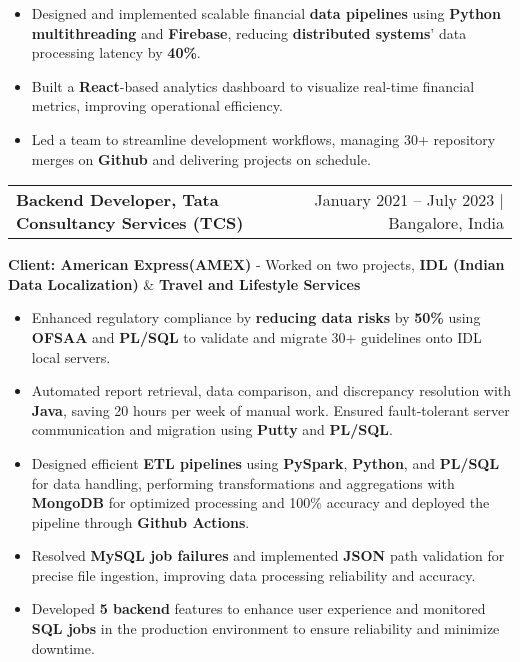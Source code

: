 \documentclass[10pt, legalpaper]{article}
\newenvironment{highlights}{
    \begin{itemize}[
        topsep=0.10 cm,
        parsep=0.10 cm,
        partopsep=0pt,
        itemsep=0pt,
        leftmargin=0 cm + 10pt
    ]
}{
    \end{itemize}
}
\newenvironment{onecolentry}{
    \par\noindent
}{
    \par
}
\begin{document}
\begin{onecolentry}
    \begin{highlights}
        \item Designed and implemented scalable financial \textbf{data pipelines} using \textbf{Python multithreading} and \textbf{Firebase}, reducing \textbf{distributed systems}' data processing latency by \textbf{40\%}.
        \item Built a \textbf{React}-based analytics dashboard to visualize real-time financial metrics, improving operational efficiency.
        \item Led a team to streamline development workflows, managing 30+ repository merges on \textbf{Github} and delivering projects on schedule.
    \end{highlights}
\end{onecolentry}

\vspace{0.0 cm}


\begin{tabularx}{\textwidth}{@{}Xr@{}}
    \textbf{Backend Developer, Tata Consultancy Services (TCS)} & January 2021 – July 2023 | Bangalore, India \\
\end{tabularx}
\vspace{-4.0mm}

\begin{onecolentry}

\textbf{Client: American Express(AMEX)} - Worked on two projects, \textbf{IDL (Indian Data Localization)} \& \textbf{Travel and Lifestyle Services}
\vspace{-1mm}
    \begin{highlights}
        \item Enhanced regulatory compliance by \textbf{reducing data risks} by\textbf{ 50\%} using \textbf{OFSAA} and \textbf{PL/SQL} to validate and migrate 30+ guidelines onto IDL local servers.
        \item Automated report retrieval, data comparison, and discrepancy resolution with \textbf{Java}, saving 20 hours per week of manual work. Ensured fault-tolerant server communication and migration using \textbf{Putty} and \textbf{PL/SQL}.
        \item Designed efficient \textbf{ETL pipelines} using \textbf{PySpark}, \textbf{Python}, and \textbf{PL/SQL} for data handling, performing transformations and aggregations with \textbf{MongoDB} for optimized processing and 100\% accuracy and deployed the pipeline through \textbf{Github Actions}.
        \item Resolved \textbf{MySQL job failures} and implemented\textbf{ JSON} path validation for precise file ingestion, improving data processing reliability and accuracy.
        \item Developed\textbf{ 5 backend} features to enhance user experience and monitored \textbf{SQL jobs} in the production environment to ensure reliability and minimize downtime.
    \end{highlights}
\end{onecolentry}
\end{document}

